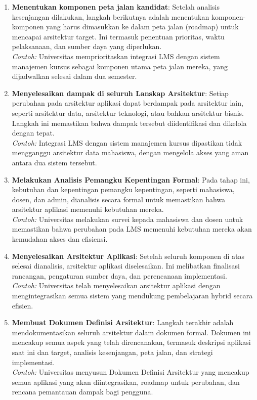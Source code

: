 \begin{enumerate}
	\item \textbf{Menentukan komponen peta jalan kandidat}: Setelah analisis kesenjangan dilakukan, langkah berikutnya adalah menentukan komponen-komponen yang harus dimasukkan ke dalam peta jalan (roadmap) untuk mencapai arsitektur target. Ini termasuk penentuan prioritas, waktu pelaksanaan, dan sumber daya yang diperlukan.
	\\
	\textit{Contoh:} Universitas memprioritaskan integrasi LMS dengan sistem manajemen kursus sebagai komponen utama peta jalan mereka, yang dijadwalkan selesai dalam dua semester.
	
	\item \textbf{Menyelesaikan dampak di seluruh Lanskap Arsitektur}: Setiap perubahan pada arsitektur aplikasi dapat berdampak pada arsitektur lain, seperti arsitektur data, arsitektur teknologi, atau bahkan arsitektur bisnis. Langkah ini memastikan bahwa dampak tersebut diidentifikasi dan dikelola dengan tepat.
	\\
	\textit{Contoh:} Integrasi LMS dengan sistem manajemen kursus dipastikan tidak mengganggu arsitektur data mahasiswa, dengan mengelola akses yang aman antara dua sistem tersebut.
	
	\item \textbf{Melakukan Analisis Pemangku Kepentingan Formal}: Pada tahap ini, kebutuhan dan kepentingan pemangku kepentingan, seperti mahasiswa, dosen, dan admin, dianalisis secara formal untuk memastikan bahwa arsitektur aplikasi memenuhi kebutuhan mereka.
	\\
	\textit{Contoh:} Universitas melakukan survei kepada mahasiswa dan dosen untuk memastikan bahwa perubahan pada LMS memenuhi kebutuhan mereka akan kemudahan akses dan efisiensi.
	
	\item \textbf{Menyelesaikan Arsitektur Aplikasi}: Setelah seluruh komponen di atas selesai dianalisis, arsitektur aplikasi diselesaikan. Ini melibatkan finalisasi rancangan, pengaturan sumber daya, dan perencanaan implementasi.
	\\
	\textit{Contoh:} Universitas telah menyelesaikan arsitektur aplikasi dengan mengintegrasikan semua sistem yang mendukung pembelajaran hybrid secara efisien.
	
	\item \textbf{Membuat Dokumen Definisi Arsitektur}: Langkah terakhir adalah mendokumentasikan seluruh arsitektur dalam dokumen formal. Dokumen ini mencakup semua aspek yang telah direncanakan, termasuk deskripsi aplikasi saat ini dan target, analisis kesenjangan, peta jalan, dan strategi implementasi.
	\\
	\textit{Contoh:} Universitas menyusun Dokumen Definisi Arsitektur yang mencakup semua aplikasi yang akan diintegrasikan, roadmap untuk perubahan, dan rencana pemantauan dampak bagi pengguna.
\end{enumerate}

